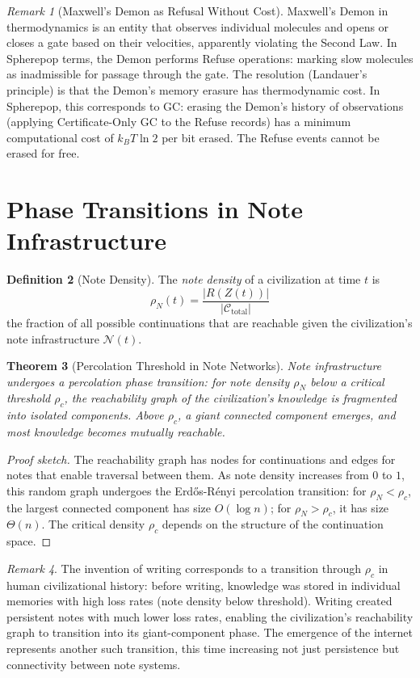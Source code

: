 \documentclass[12pt, a4paper, openany]{book}
\theoremstyle{plain}
\newtheorem{theorem}{Theorem}[chapter]
\theoremstyle{definition}
\newtheorem{definition}[theorem]{Definition}
\theoremstyle{remark}
\newtheorem{remark}[theorem]{Remark}
\newcommand{\calC}{\mathcal{C}}
\newcommand{\calN}{\mathcal{N}}
\begin{document}
\begin{remark}[Maxwell's Demon as Refusal Without Cost]
Maxwell's Demon in thermodynamics is an entity that observes individual molecules
and opens or closes a gate based on their velocities, apparently violating the
Second Law. In Spherepop terms, the Demon performs Refuse operations: marking
slow molecules as inadmissible for passage through the gate. The resolution
(Landauer's principle) is that the Demon's memory erasure has thermodynamic
cost. In Spherepop, this corresponds to GC: erasing the Demon's history of
observations (applying Certificate-Only GC to the Refuse records) has a minimum
computational cost of $k_B T \ln 2$ per bit erased. The Refuse events cannot
be erased for free.
\end{remark}

\section{Phase Transitions in Note Infrastructure}

\begin{definition}[Note Density]
The \emph{note density} of a civilization at time $t$ is
\[
\rho_N(t) = \frac{|R(Z(t))|}{|\calC_{\mathrm{total}}|}
\]
the fraction of all possible continuations that are reachable given the
civilization's note infrastructure $\calN(t)$.
\end{definition}

\begin{theorem}[Percolation Threshold in Note Networks]
Note infrastructure undergoes a percolation phase transition: for note density
$\rho_N$ below a critical threshold $\rho_c$, the reachability graph of the
civilization's knowledge is fragmented into isolated components. Above $\rho_c$,
a giant connected component emerges, and most knowledge becomes mutually reachable.
\end{theorem}

\begin{proof}[Proof sketch]
The reachability graph has nodes for continuations and edges for notes that
enable traversal between them. As note density increases from $0$ to $1$, this
random graph undergoes the Erd\H{o}s-R\'enyi percolation transition: for
$\rho_N < \rho_c$, the largest connected component has size $O(\log n)$; for
$\rho_N > \rho_c$, it has size $\Theta(n)$. The critical density $\rho_c$
depends on the structure of the continuation space.
\end{proof}

\begin{remark}
The invention of writing corresponds to a transition through $\rho_c$ in human
civilizational history: before writing, knowledge was stored in individual
memories with high loss rates (note density below threshold). Writing created
persistent notes with much lower loss rates, enabling the civilization's
reachability graph to transition into its giant-component phase. The emergence
of the internet represents another such transition, this time increasing not
just persistence but connectivity between note systems.
\end{remark}
\end{document}
